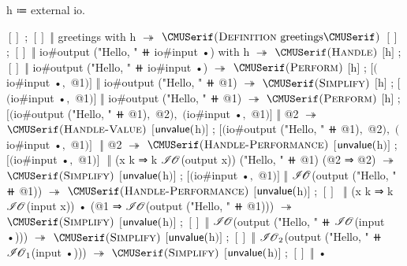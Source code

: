 \begin{snippet}[caption={Handle greetings with standard \IO}]
h ≔ external io.

$[]$ ; $[]$ ‖ greetings with h
$↠$ $\ruleappwith{Definition}{greetings}$
$[]$ ; $[]$ ‖ io#output ("Hello, " ⧺ io#input •) with h
$↠$ $\ruleapp{Handle}$
$[$h$]$ ; $[]$ ‖ io#output ("Hello, " ⧺ io#input •)
$↠$ $\ruleapp{Perform}$
$[$h$]$ ; $[$$($io#input •$,$ @1$)$$]$ ‖ io#output ("Hello, " ⧺ @1)
$↠$ $\ruleapp{Simplify}$
$[$h$]$ ; $[$$($io#input •$,$ @1$)$$]$ ‖ io#output ("Hello, " ⧺ @1)
$↠$ $\ruleapp{Perform}$
$[$h$]$ ; $[$$($io#output ("Hello, " ⧺ @1)$,$ @2$)$$,$ $($io#input •$,$ @1$)$$]$ ‖ @2
$↠$ $\ruleapp{Handle-Value}$
$[$$\mathsf{unvalue}($h$)$$]$ ; $[$$($io#output ("Hello, " ⧺ @1)$,$ @2$)$$,$ $($io#input •$,$ @1$)$$]$ $ $
  $ $‖ @2
$↠$ $\ruleapp{Handle-Performance}$
$[$$\mathsf{unvalue}($h$)$$]$ ; $[$$($io#input •$,$ @1$)$$]$ $ $
  $ $‖ (x k ⇒ k $\mathscr{I\hspace{-0.1em}O}$(output x)) ("Hello, " ⧺ @1) (@2 ⇒ @2)
$↠$ $\ruleapp{Simplify}$
$[$$\mathsf{unvalue}($h$)$$]$ ; $[$$($io#input •$,$ @1$)$$]$ ‖ $\mathscr{I\hspace{-0.1em}O}$(output ("Hello, " ⧺ @1))
$↠$ $\ruleapp{Handle-Performance}$
$[$$\mathsf{unvalue}($h$)$$]$ ; $[]$ $ $
  $ $‖ (x k ⇒ k $\mathscr{I\hspace{-0.1em}O}$(input x)) • (@1 ⇒ $\mathscr{I\hspace{-0.1em}O}$(output ("Hello, " ⧺ @1)))
$↠$ $\ruleapp{Simplify}$
$[$$\mathsf{unvalue}($h$)$$]$ ; $[]$ ‖ $\mathscr{I\hspace{-0.1em}O}$(output ("Hello, " ⧺ $\mathscr{I\hspace{-0.1em}O}$(input •)))
$↠$ $\ruleapp{Simplify}$
$[$$\mathsf{unvalue}($h$)$$]$ ; $[]$ ‖ $\mathscr{I\hspace{-0.1em}O}_2$(output ("Hello, " ⧺ $\mathscr{I\hspace{-0.1em}O}_1$(input •)))
$↠$ $\ruleapp{Simplify}$
$[$$\mathsf{unvalue}($h$)$$]$ ; $[]$ ‖ •
\end{snippet}
